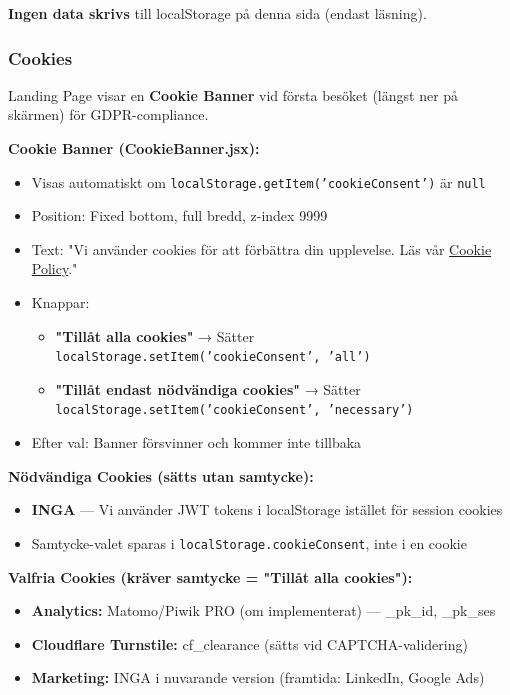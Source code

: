 \documentclass[12pt,a4paper]{article}
\begin{document}
\textbf{Ingen data skrivs} till localStorage på denna sida (endast läsning).

\subsubsection{Cookies}
Landing Page visar en \textbf{Cookie Banner} vid första besöket (längst ner på skärmen) för GDPR-compliance.

\textbf{Cookie Banner (CookieBanner.jsx):}
\begin{itemize}[noitemsep]
  \item Visas automatiskt om \texttt{localStorage.getItem('cookieConsent')} är \texttt{null}
  \item Position: Fixed bottom, full bredd, z-index 9999
  \item Text: "Vi använder cookies för att förbättra din upplevelse. Läs vår \href{/cookie-policy}{Cookie Policy}."
  \item Knappar:
  \begin{itemize}[noitemsep]
    \item \textbf{"Tillåt alla cookies"} → Sätter \texttt{localStorage.setItem('cookieConsent', 'all')}
    \item \textbf{"Tillåt endast nödvändiga cookies"} → Sätter \texttt{localStorage.setItem('cookieConsent', 'necessary')}
  \end{itemize}
  \item Efter val: Banner försvinner och kommer inte tillbaka
\end{itemize}

\textbf{Nödvändiga Cookies (sätts utan samtycke):}
\begin{itemize}[noitemsep]
  \item \textbf{INGA} — Vi använder JWT tokens i localStorage istället för session cookies
  \item Samtycke-valet sparas i \texttt{localStorage.cookieConsent}, inte i en cookie
\end{itemize}

\textbf{Valfria Cookies (kräver samtycke = "Tillåt alla cookies"):}
\begin{itemize}[noitemsep]
  \item \textbf{Analytics:} Matomo/Piwik PRO (om implementerat) — \_pk\_id, \_pk\_ses
  \item \textbf{Cloudflare Turnstile:} cf\_clearance (sätts vid CAPTCHA-validering)
  \item \textbf{Marketing:} INGA i nuvarande version (framtida: LinkedIn, Google Ads)
\end{itemize}
\end{document}
